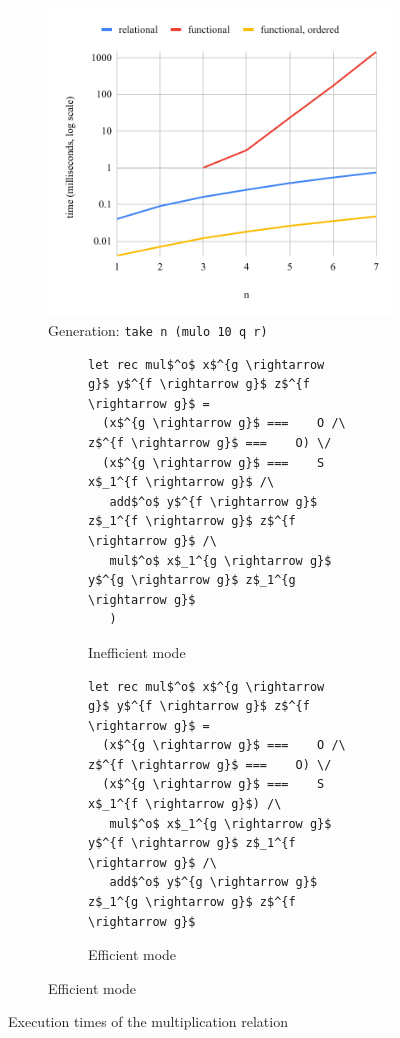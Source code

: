 \begin{figure}[h]
\hfill

    \begin{subfigure}[b]{0.49\textwidth}
      \includegraphics[width=\textwidth]{fig/muloIOO.pdf}
    \caption{Generation: \lstinline{take n (mulo 10 q r)}}
    \label{fig:mulo_IOO}
  \end{subfigure}
\hfill
  \begin{subfigure}[b]{0.45\textwidth}
    \begin{subfigure}[b]{\textwidth}
    \begin{lstlisting}[frame=tb]
let rec mul$^o$ x$^{g \rightarrow g}$ y$^{f \rightarrow g}$ z$^{f \rightarrow g}$ =
  (x$^{g \rightarrow g}$ ===    O /\ z$^{f \rightarrow g}$ ===    O) \/
  (x$^{g \rightarrow g}$ ===    S x$_1^{f \rightarrow g}$ /\
   add$^o$ y$^{f \rightarrow g}$ z$_1^{f \rightarrow g}$ z$^{f \rightarrow g}$ /\
   mul$^o$ x$_1^{g \rightarrow g}$ y$^{g \rightarrow g}$ z$_1^{g \rightarrow g}$
   )
    \end{lstlisting}
    \caption{Inefficient mode}
    \label{fig:mult_modded_bad}
  \end{subfigure}
  \hfill

    \begin{subfigure}[b]{\textwidth}
    \begin{lstlisting}[frame=tb]
let rec mul$^o$ x$^{g \rightarrow g}$ y$^{f \rightarrow g}$ z$^{f \rightarrow g}$ =
  (x$^{g \rightarrow g}$ ===    O /\ z$^{f \rightarrow g}$ ===    O) \/
  (x$^{g \rightarrow g}$ ===    S x$_1^{f \rightarrow g}$) /\
   mul$^o$ x$_1^{g \rightarrow g}$ y$^{f \rightarrow g}$ z$_1^{f \rightarrow g}$ /\
   add$^o$ y$^{g \rightarrow g}$ z$_1^{g \rightarrow g}$ z$^{f \rightarrow g}$
    \end{lstlisting}
    \caption{Efficient mode}
    \label{fig:mult_modded_good}
  \end{subfigure}
  \end{subfigure}

  \caption{Execution times of the multiplication relation}
  \label{fig:mulo_time}
\end{figure}
